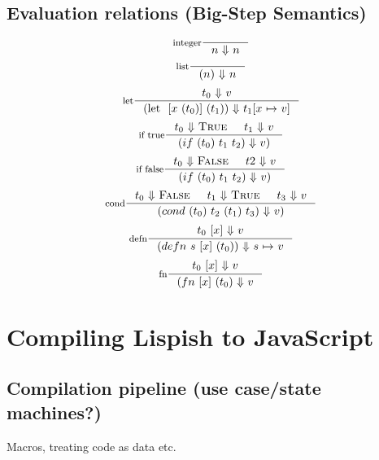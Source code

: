 \subsection{Evaluation relations (Big-Step Semantics)}

\[ 
\inference[integer]{}
{n \ $$\Downarrow$$ \ n}
\]
\[ 
\inference[list]{}
{(n) \ $$\Downarrow$$ \ n}
\]
\[
\inference[let]{t_0 \ $$\Downarrow$$ \ v}
{(\text{let } \ {[x \ (t_0)]} \ (t_1)) \ $$\Downarrow$$ \ t_1 {[}x \ $$\mapsto$$ \ v{]} }
\]
\[
\inference[if true]{{t_0} \ $$\Downarrow$$ \ \textsc{True} & t_1 \ $$\Downarrow$$ \ v}
{(if \ (t_0) \ t_1 \ t_2) \ $$\Downarrow$$ \ v) }
\]
\[
\inference[if false]{t_0 \ $$\Downarrow$$ \ \textsc{False} & t2 \ $$\Downarrow$$ \ v}
{(if \ (t_0) \ t_1 \ t_2) \ $$\Downarrow$$ \ v) }
\]
\[
\inference[cond]{t_0 \ $$\Downarrow$$ \ \textsc{False} & t_1 \ $$\Downarrow$$ \ \textsc{True} & t_3 \ $$\Downarrow$$ \ v}
{(cond \ (t_0) \ t_2 \ (t_1) \ t_3) \ $$\Downarrow$$ \ v) }
\]
\[
\inference[defn]{ {t_0 \ [x]} \ $$\Downarrow$$ \ v}
{(defn \ s \ {[x]} \ (t_0)) \ $$\Downarrow$$ \ s \ $$\mapsto$$ \ v }
\]
\[
\inference[fn]{ {t_0 \ [x]} \ $$\Downarrow$$ \ v}
{(fn \ {[x]}  \ (t_0) \ $$\Downarrow$$ \ v }
\]



\section{Compiling Lispish to JavaScript}

\subsection{Compilation pipeline (use case/state machines?)}
Macros, treating code as data etc.

